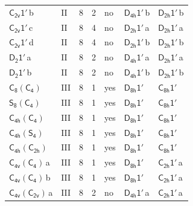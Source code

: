 \documentclass[10pt,a4paper]{article}
\numberwithin{equation}{section}
\newcommand{\grp}[1]{\mathsf{#1}}
\newcommand{\clsletter}[1]{\,{\scriptsize\color{black!55}#1}}
\begin{document}
{\begin{longtable}{@{}llrrlll@{}}
\href{C2v-1p.pdf}{$\grp{C_{2v}1'}$}\clsletter{b} & II & 8 & 2 & no & \href{D4h-1p.pdf}{$\grp{D_{4h}1'}$}\clsletter{b} & \href{D2h-1p.pdf}{$\grp{D_{2h}1'}$}\clsletter{b}\\
\href{C2v-1p.pdf}{$\grp{C_{2v}1'}$}\clsletter{c} & II & 8 & 4 & no & \href{D2h-1p.pdf}{$\grp{D_{2h}1'}$}\clsletter{a} & \href{D2h-1p.pdf}{$\grp{D_{2h}1'}$}\clsletter{a}\\
\href{C2v-1p.pdf}{$\grp{C_{2v}1'}$}\clsletter{d} & II & 8 & 4 & no & \href{D2h-1p.pdf}{$\grp{D_{2h}1'}$}\clsletter{b} & \href{D2h-1p.pdf}{$\grp{D_{2h}1'}$}\clsletter{b}\\
\href{D2-1p.pdf}{$\grp{D_{2}1'}$}\clsletter{a} & II & 8 & 2 & no & \href{D4h-1p.pdf}{$\grp{D_{4h}1'}$}\clsletter{a} & \href{D2h-1p.pdf}{$\grp{D_{2h}1'}$}\clsletter{a}\\
\href{D2-1p.pdf}{$\grp{D_{2}1'}$}\clsletter{b} & II & 8 & 2 & no & \href{D4h-1p.pdf}{$\grp{D_{4h}1'}$}\clsletter{b} & \href{D2h-1p.pdf}{$\grp{D_{2h}1'}$}\clsletter{b}\\
\href{C8-C4.pdf}{$\grp{C_{8}}(\grp{C_{4}})$} & III & 8 & 1 & yes & \href{D8h-1p.pdf}{$\grp{D_{8h}1'}$} & \href{C8h-1p.pdf}{$\grp{C_{8h}1'}$}\\
\href{S8-C4.pdf}{$\grp{S_{8}}(\grp{C_{4}})$} & III & 8 & 1 & yes & \href{D8h-1p.pdf}{$\grp{D_{8h}1'}$} & \href{C8h-1p.pdf}{$\grp{C_{8h}1'}$}\\
\href{C4h-C4.pdf}{$\grp{C_{4h}}(\grp{C_{4}})$} & III & 8 & 1 & yes & \href{D8h-1p.pdf}{$\grp{D_{8h}1'}$} & \href{C8h-1p.pdf}{$\grp{C_{8h}1'}$}\\
\href{C4h-S4.pdf}{$\grp{C_{4h}}(\grp{S_{4}})$} & III & 8 & 1 & yes & \href{D8h-1p.pdf}{$\grp{D_{8h}1'}$} & \href{C8h-1p.pdf}{$\grp{C_{8h}1'}$}\\
\href{C4h-C2h.pdf}{$\grp{C_{4h}}(\grp{C_{2h}})$} & III & 8 & 1 & yes & \href{D8h-1p.pdf}{$\grp{D_{8h}1'}$} & \href{C8h-1p.pdf}{$\grp{C_{8h}1'}$}\\
\href{C4v-C4.pdf}{$\grp{C_{4v}}(\grp{C_{4}})$}\clsletter{a} & III & 8 & 1 & yes & \href{D8h-1p.pdf}{$\grp{D_{8h}1'}$} & \href{C2h-1p.pdf}{$\grp{C_{2h}1'}$}\clsletter{a}\\
\href{C4v-C4.pdf}{$\grp{C_{4v}}(\grp{C_{4}})$}\clsletter{b} & III & 8 & 1 & yes & \href{D8h-1p.pdf}{$\grp{D_{8h}1'}$} & \href{C2h-1p.pdf}{$\grp{C_{2h}1'}$}\clsletter{a}\\
\href{C4v-C2v.pdf}{$\grp{C_{4v}}(\grp{C_{2v}})$}\clsletter{a} & III & 8 & 2 & no & \href{D4h-1p.pdf}{$\grp{D_{4h}1'}$}\clsletter{a} & \href{C2h-1p.pdf}{$\grp{C_{2h}1'}$}\clsletter{a}\\

\end{longtable}}
\end{document}
